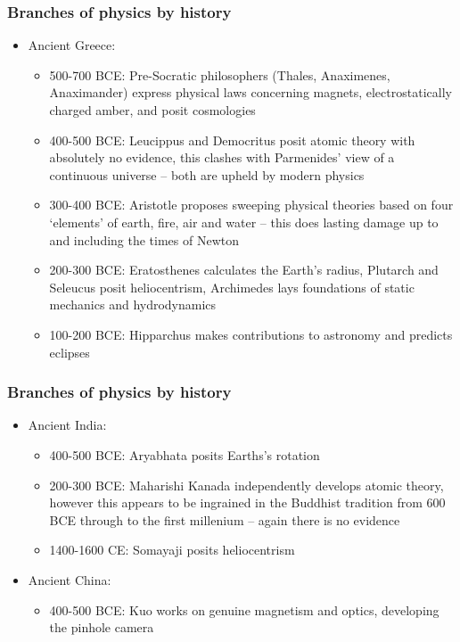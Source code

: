 \documentclass{beamer}
\begin{document}
\begin{frame}
\frametitle{Branches of physics by history}
\begin{itemize}
  \item<1-> Ancient Greece:
    \begin{itemize}
      \item<2-> 500-700 BCE: Pre-Socratic philosophers (Thales, Anaximenes, Anaximander) express physical laws concerning magnets, electrostatically charged amber, and posit cosmologies
      \item<3-> 400-500 BCE: Leucippus and Democritus posit atomic theory with absolutely no evidence, this clashes with Parmenides' view of a continuous universe -- both are upheld by modern physics
      \item<4-> 300-400 BCE: Aristotle proposes sweeping physical theories based on four `elements' of earth, fire, air and water -- this does lasting damage up to and including the times of Newton
      \item<5-> 200-300 BCE: Eratosthenes calculates the Earth's radius, Plutarch and Seleucus posit heliocentrism, Archimedes lays foundations of static mechanics and hydrodynamics
      \item<6-> 100-200 BCE: Hipparchus makes contributions to astronomy and predicts eclipses
    \end{itemize}
\end{itemize}
\end{frame}

\begin{frame}
\frametitle{Branches of physics by history}
\begin{itemize}
  \item<1-> Ancient India:
    \begin{itemize}
      \item<2-> 400-500 BCE: Aryabhata posits Earths's rotation
      \item<3-> 200-300 BCE: Maharishi Kanada independently develops atomic theory, however this appears to be ingrained in the Buddhist tradition from 600 BCE through to the first millenium -- again there is no evidence
      \item<4-> 1400-1600 CE: Somayaji posits heliocentrism
    \end{itemize}
  \item<5-> Ancient China:
    \begin{itemize}
      \item<6-> 400-500 BCE: Kuo works on genuine magnetism and optics, developing the pinhole camera
    \end{itemize}
\end{itemize}
\end{frame}
\end{document}
